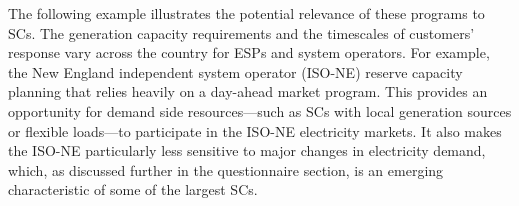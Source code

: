 

The following example illustrates the potential relevance of these programs to SCs.
The generation capacity requirements and the timescales of customers' response vary across the country for ESPs and system operators. For example, the New England independent system operator (ISO-NE) reserve capacity planning that relies heavily on a day-ahead market program. This provides an opportunity for demand side resources---such as SCs with local generation sources or flexible loads---to participate in the ISO-NE electricity markets. It also makes the ISO-NE particularly less sensitive to major changes in electricity demand, which, as discussed further in the questionnaire section, is an emerging characteristic of some of the largest SCs.